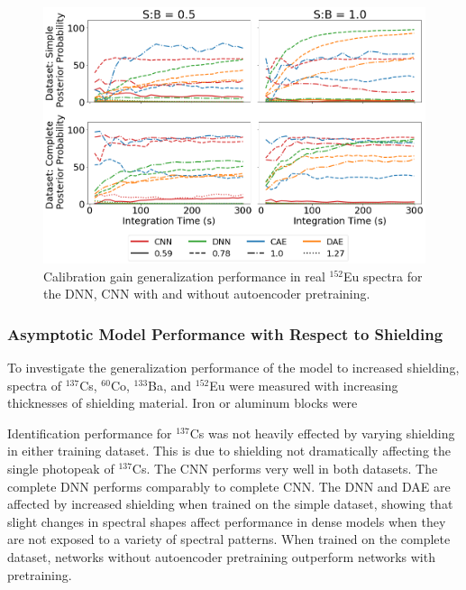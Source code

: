 \begin{figure}[H]
	\centering
	\includegraphics[width=1.0\linewidth]{images/realspectra-cal-eu152}
	\caption{Calibration gain generalization performance in real $^{152}$Eu spectra for the DNN, CNN with and without autoencoder pretraining.}
	\label{fig:realspectra-cal-eu152}
\end{figure}

\subsubsection{Asymptotic Model Performance with Respect to Shielding} \label{real_shielding_performance}

To investigate the generalization performance of the model to increased shielding, spectra of $^{137}$Cs, $^{60}$Co, $^{133}$Ba, and $^{152}$Eu were measured with increasing thicknesses of shielding material. Iron or aluminum blocks were 

Identification performance for $^{137}$Cs was not heavily effected by varying shielding in either training dataset. This is due to shielding not dramatically affecting the single photopeak of $^{137}$Cs. The CNN performs very well in both datasets. The complete DNN performs comparably to complete CNN. The DNN and DAE are affected by increased shielding when trained on the simple dataset, showing that slight changes in spectral shapes affect performance in dense models when they are not exposed to a variety of spectral patterns. When trained on the complete dataset, networks without autoencoder pretraining outperform networks with pretraining.



